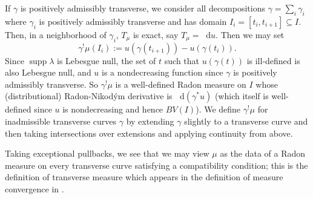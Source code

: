 \documentclass[reqno,11pt]{amsart}
\newcommand*\dif{\mathop{}\!\mathrm{d}}
\DeclareMathOperator{\supp}{supp}
\theoremstyle{definition}
\numberwithin{equation}{section}
\begin{document}
If $\gamma$ is positively admissibly transverse, we consider all decompositions $\gamma = \sum_i \gamma_i$ where $\gamma_i$ is positively admissibly transverse and has domain $I_i = [t_i, t_{i + 1}] \subseteq I$.
Then, in a neighborhood of $\gamma_i$, $T_\mu$ is exact, say $T_\mu = \dif u$. Then we may set 
$$\gamma^! \mu(I_i) := u(\gamma(t_{i + 1})) - u(\gamma(t_i)).$$
Since $\supp \lambda$ is Lebesgue null, the set of $t$ such that $u(\gamma(t))$ is ill-defined is also Lebesgue null, and $u$ is a nondecreasing function since $\gamma$ is positively admissibly transverse.
So $\gamma^! \mu$ is a well-defined Radon measure on $I$ whose (distributional) Radon-Nikod\'ym derivative is $\dif(\gamma^* u)$ (which itself is well-defined since $u$ is nondecreasing and hence $BV(I)$).
We define $\gamma^! \mu$ for inadmissible transverse curves $\gamma$ by extending $\gamma$ slightly to a transverse curve and then taking intersections over extensions and applying continuity from above.

Taking exceptional pullbacks, we see that we may view $\mu$ as the data of a Radon measure on every transverse curve satisfying a compatibility condition; this is the definition of transverse measure which appears in the definition of measure convergence in \cite[\S8.6]{thurston1979geometry}.
\end{document}

